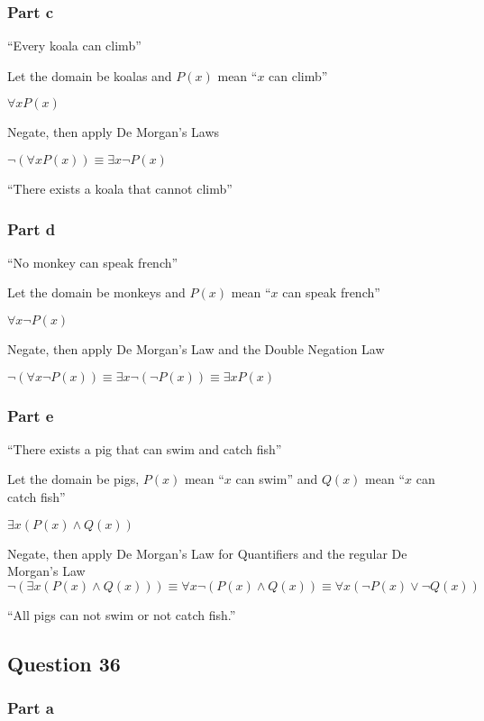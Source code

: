 \documentclass[12pt]{article}
\begin{document}
\subsubsection*{Part c}

\enquote{Every koala can climb}

Let the domain be koalas and $P(x)$ mean \enquote{$x$ can climb}

$\forall x P(x)$

Negate, then apply De Morgan's Laws

$\neg (\forall x P(x)) \equiv \exists x \neg P(x)$

\enquote{There exists a koala that cannot climb}

\subsubsection*{Part d}

\enquote{No monkey can speak french}

Let the domain be monkeys and $P(x)$ mean \enquote{$x$ can speak french}

$\forall x \neg P(x)$

Negate, then apply De Morgan's Law and the Double Negation Law

$\neg (\forall x \neg P(x)) \equiv \exists x \neg (\neg P(x)) \equiv \exists x P(x)$

\subsubsection*{Part e}

\enquote{There exists a pig that can swim and catch fish}

Let the domain be pigs, $P(x)$ mean \enquote{$x$ can swim} and $Q(x)$ mean 
\enquote{$x$ can catch fish}

$\exists x (P(x) \land Q(x))$

Negate, then apply De Morgan's Law for Quantifiers and the regular De Morgan's Law
$\neg (\exists x (P(x) \land Q(x))) \equiv \forall x \neg (P(x) \land Q(x)) 
\equiv \forall x (\neg P(x) \lor \neg Q(x))$

\enquote{All pigs can not swim or not catch fish.}

\subsection*{Question 36}

\subsubsection*{Part a}
\end{document}
